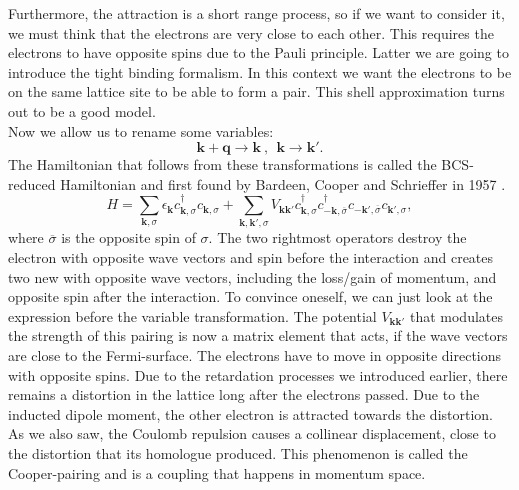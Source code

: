 \documentclass[../main.tex]{subfile}
\begin{document}
Furthermore, the attraction is a short range process, so if we want to consider it, we must think that the electrons are very close to each other.
This requires the electrons to have opposite spins due to the Pauli principle. Latter we are going to introduce the tight binding formalism. In this context we want
the electrons to be on the same lattice site to be able to form a pair. This shell approximation turns out to be a good model.\\

Now we allow us to rename some variables:
\[
    \bm{k} + \bm{q} \longrightarrow \bm{k} ~,~~ \bm{k} \longrightarrow \bm{k}'.
\]
The Hamiltonian that follows from these transformations is called the BCS-reduced Hamiltonian and first found by Bardeen, Cooper and Schrieffer in 1957 \cite{BCS1957}.
\begin{equation} \label{eq:BCS_ReducedHamiltonian}
    H = \sum_{\bm{k},\sigma} \epsilon_{\bm{k}} c_{\bm{k},\sigma}^{\dagger}c_{\bm{k},\sigma} +
     \sum_{\bm{k},\bm{k}',\sigma} V_{\bm{k}\bm{k}'} c_{\bm{k},\sigma}^{\dagger}c_{-\bm{k},\overline{\sigma}}^{\dagger}c_{-\bm{k}',\overline{\sigma}}c_{\bm{k}',\sigma},
\end{equation}
where $\overline{\sigma}$ is the opposite spin of $\sigma$. 
The two rightmost operators destroy the electron with opposite wave vectors and spin before the interaction and creates two new with opposite wave vectors, including the
 loss/gain of momentum, and opposite spin after the interaction. To convince oneself, we can just look at the expression before the variable transformation. The potential $V_{\bm{k}\bm{k}'}$ 
 that modulates the strength of this pairing is now a matrix element that acts, if the wave vectors are close to the Fermi-surface. The electrons have to move in opposite directions with opposite spins.
Due to the retardation processes we introduced earlier, there remains a distortion in the lattice long after the electrons passed. Due to the inducted dipole moment,
the other electron is attracted towards the distortion. As we also saw, the Coulomb repulsion causes a collinear displacement, close to the distortion
that its homologue produced. This phenomenon is called the Cooper-pairing and is a coupling that happens in momentum space.
\end{document}
